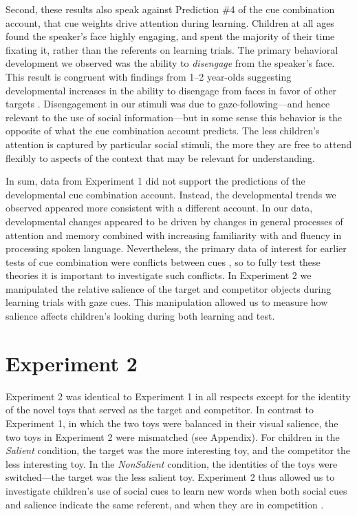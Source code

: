 \documentclass[man,floatsintext]{apa6}
\begin{document}
Second, these results also speak against Prediction \#4 of the cue combination account, that cue weights drive attention during learning. Children at all ages found the speaker's face highly engaging, and spent the majority of their time fixating it, rather than the referents on learning trials. The primary behavioral development we observed was the ability to {\it disengage} from the speaker's face. This result is congruent with findings from 1--2 year-olds suggesting developmental increases in the ability to disengage from faces in favor of other targets \cite{Frank2012d}. Disengagement in our stimuli was due to gaze-following---and hence relevant to the use of social information---but in some sense this behavior is the opposite of what the cue combination account predicts. The less children's attention is captured by particular social stimuli, the more they are free to attend flexibly to aspects of the context that may be relevant for understanding. 

In sum, data from Experiment 1 did not support the predictions of the developmental cue combination account. Instead, the developmental trends we observed appeared more consistent with a different account. In our data, developmental changes appeared to be driven by changes in general processes of attention and memory combined with increasing familiarity with and fluency in processing spoken language. Nevertheless, the primary data of interest for earlier tests of cue combination were conflicts between cues \cite{Hollich2000}, so to fully test these theories it is important to investigate such conflicts. In Experiment 2 we manipulated the relative salience of the target and competitor objects during learning trials with gaze cues. This manipulation allowed us to measure how salience affects children's looking during both learning and test.

\section{Experiment 2}

Experiment 2 was identical to Experiment 1 in all respects except for the identity of the novel toys that served as the target and competitor. In contrast to Experiment 1, in which the two toys were balanced in their visual salience, the two toys in Experiment 2 were mismatched (see Appendix). For children in the \emph{Salient} condition, the target was the more interesting toy, and the competitor the less interesting toy. In the \emph{NonSalient} condition, the identities of the toys were switched---the target was the less salient toy. Experiment 2 thus allowed us to investigate children's use of social cues to learn new words when both social cues and salience indicate the same referent, and when they are in competition \cite<as in>{Hollich2000,Pruden2006}.
\end{document}
